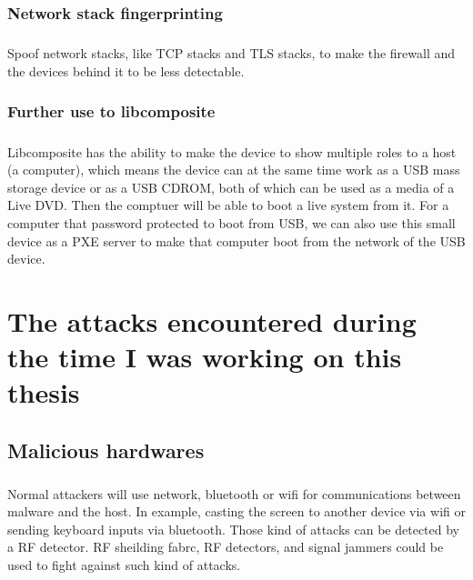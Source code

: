 \documentclass[mscthesis]{usiinfthesis}
\begin{document}
\subsection{Network stack fingerprinting}
\paragraph{}
Spoof network stacks, like TCP stacks and TLS stacks, to make the firewall and the devices behind it to be less detectable.

\subsection{Further use to libcomposite}
\paragraph{}
Libcomposite has the ability to make the device to show multiple roles to a host (a computer), which means the device can at the same time work as a USB mass storage device or as a USB CDROM, both of which can be used as a media of a Live DVD. Then the comptuer will be able to boot a live system from it. For a computer that password protected to boot from USB, we can also use this small device as a PXE server to make that computer boot from the network of the USB device.

\chapter{The attacks encountered during the time I was working on this thesis}

\section{Malicious hardwares}
\paragraph{}
Normal attackers will use network, bluetooth or wifi for communications between malware and the host. In example, casting the screen to another device via wifi or sending keyboard inputs via bluetooth. Those kind of attacks can be detected by a RF detector. RF sheilding fabrc, RF detectors, and signal jammers could be used to fight against such kind of attacks.
\end{document}
